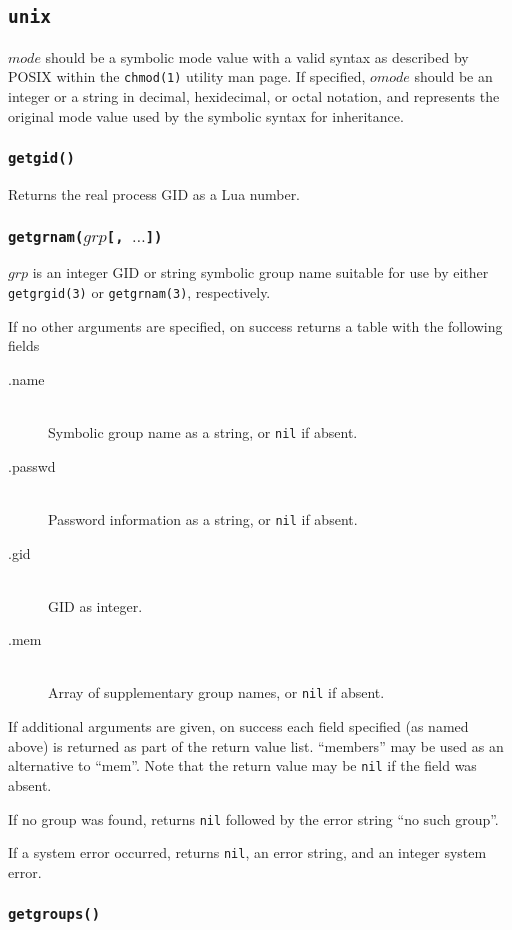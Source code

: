 \documentclass[11pt, oneside]{memoir}
\newcommand*{\nil}[0]{\texttt{nil}\xspace}
\newcommand*{\syscall}[1]{\texttt{#1}\xspace}
\newcommand*{\fn}[1]{\texttt{#1}\xspace}
\newcounter{toccols}
\newenvironment{Module}[1]{
	\subsection{\texttt{#1}}
	\addtocontents{toc}{
		\protect\begin{multicols}{\value{toccols}}
	}
}{
	\addtocontents{toc}{\protect\end{multicols}}
}
\begin{document}
\begin{Module}{unix}
$mode$ should be a symbolic mode value with a valid syntax as described by POSIX within the \syscall{chmod(1)} utility man page. If specified, $omode$ should be an integer or a string in decimal, hexidecimal, or octal notation, and represents the original mode value used by the symbolic syntax for inheritance.

\subsubsection[\fn{getgid}]{\fn{getgid()}}

Returns the real process GID as a Lua number.

\subsubsection[\fn{getgrnam}]{\fn{getgrnam($grp$[, $\ldots$])}}

$grp$ is an integer GID or string symbolic group name suitable for use by either \syscall{getgrgid(3)} or \syscall{getgrnam(3)}, respectively.

If no other arguments are specified, on success returns a table with the following fields

\begin{description}
\item[.name] \hfill \\
Symbolic group name as a string, or \nil if absent.
\item[.passwd] \hfill \\
Password information as a string, or \nil if absent.
\item[.gid] \hfill \\
GID as integer.
\item[.mem] \hfill \\
Array of supplementary group names, or \nil if absent.
\end{description}

If additional arguments are given, on success each field specified (as named above) is returned as part of the return value list. ``members'' may be used as an alternative to ``mem''. Note that the return value may be \nil if the field was absent.

If no group was found, returns \nil followed by the error string ``no such group''.

If a system error occurred, returns \nil, an error string, and an integer system error.

\subsubsection[\fn{getgroups}]{\fn{getgroups()}}


\end{Module}
\end{document}
